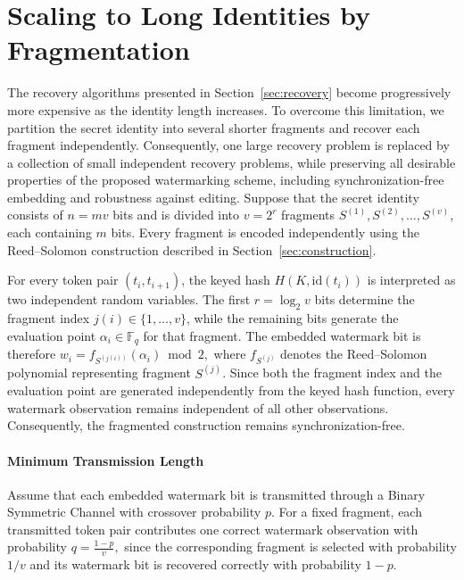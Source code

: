 \documentclass[a4paper,11pt]{llncs}
\begin{document}
\section{Scaling to Long Identities by Fragmentation}
\label{sec:fragmentation}

The recovery algorithms presented in Section~\ref{sec:recovery} become
progressively more expensive as the identity length increases.
To overcome this limitation, we partition the secret identity into
several shorter fragments and recover each fragment independently.
Consequently, one large recovery problem is replaced by a collection of
small independent recovery problems, while preserving all desirable
properties of the proposed watermarking scheme, including
synchronization-free embedding and robustness against editing.
%
Suppose that the secret identity consists of $n=mv$ bits and is divided
into $v=2^r$ fragments
$S^{(1)},S^{(2)},\ldots,S^{(v)}$, each containing $m$ bits. Every
fragment is encoded independently using the Reed--Solomon construction
described in Section~\ref{sec:construction}.


For every token pair $(t_i,t_{i+1})$, the keyed hash
$H(K,\mathrm{id}(t_i))$ is interpreted as two independent random
variables. The first $r=\log_2v$ bits determine the fragment index
$j(i)\in\{1,\ldots,v\}$, while the remaining bits generate the
evaluation point $\alpha_i\in\mathbb F_q$ for that fragment. The
embedded watermark bit is therefore
$
w_i=f_{S^{(j(i))}}(\alpha_i)\bmod2,
$
where $f_{S^{(j)}}$ denotes the Reed--Solomon polynomial representing
fragment $S^{(j)}$.
%
Since both the fragment index and the evaluation point are generated
independently from the keyed hash function, every watermark observation
remains independent of all other observations. Consequently, the
fragmented construction remains synchronization-free.

\paragraph{Minimum Transmission Length}
%
Assume that each embedded watermark bit is transmitted through a Binary
Symmetric Channel with crossover probability $p$.
%
For a fixed fragment, each transmitted token pair contributes one
correct watermark observation with probability
$
q=\frac{1-p}{v},
$
since the corresponding fragment is selected with probability $1/v$ and
its watermark bit is recovered correctly with probability $1-p$.
\end{document}
